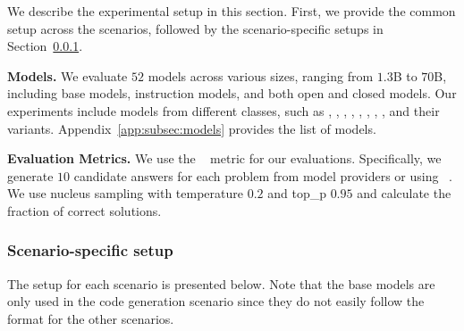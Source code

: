 We describe the experimental setup in this section.
First, we provide the common setup across the scenarios, followed by the scenario-specific setups in Section~\ref{subsec:scenario_specific_setup}.

\noindent \textbf{Models.} 
We evaluate $52$ models across various sizes, ranging from $1.3$B to $70$B, including base models, instruction models, and both open and closed models. 
Our experiments include models from different classes, such as \gpts{}, \claudes{}, \geminis{}, \mistral{}, \llamas{}, \deepseeks{}, \cllamas{}, \starcodertwo{}, \codeqwen{} and their variants.
Appendix~\ref{app:subsec:models} provides the list of models. %

\noindent \textbf{Evaluation Metrics.}
We use the ~\citep{kulal2019spoc,chen2021evaluating} metric for our evaluations. 
Specifically, we generate $10$ candidate answers for each problem from model providers or using ~\citep{kwon2023efficient}.
We use nucleus sampling with temperature $0.2$ and top\_p $0.95$ and calculate the fraction of correct solutions.%

\subsubsection{Scenario-specific setup}
\label{subsec:scenario_specific_setup}
The setup for each scenario is presented below.
Note that the base models are only used in the code generation scenario since they do not easily follow the format for the other scenarios.

